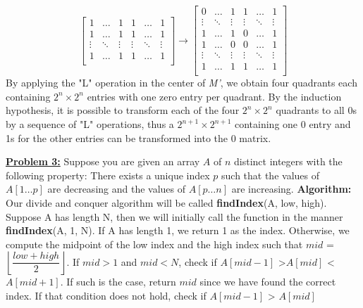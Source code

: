 \documentclass[11pt]{article}
\begin{document}
\begin{flushleft}
\[\begin{bmatrix}
			1      & \dots  & 1      & 1	  & \dots  & 1      \\     
			1      & \dots  & 1      & 1      & \dots  & 1      \\
			\vdots & \ddots & \vdots & \vdots & \ddots & \vdots \\
			1      & \dots  & 1      & 1      & \dots  & 1      \\   
		\end{bmatrix}
		\rightarrow
		\begin{bmatrix}
			0      & \dots  & 1      & 1      & \dots  & 1      \\
			\vdots & \ddots & \vdots & \vdots & \ddots & \vdots \\
			1      & \dots  & 1      & 0 	  & \dots  & 1      \\     
			1      & \dots  & 0      & 0      & \dots  & 1      \\
			\vdots & \ddots & \vdots & \vdots & \ddots & \vdots \\
			1      & \dots  & 1      & 1      & \dots  & 1      \\   
		\end{bmatrix}
		\]
		By applying the "L" operation in the center of \emph{M'}, we obtain four quadrants each containing $2^n \times 2^n$ entries with one zero entry per quadrant. By the induction hypothesis, it is possible to transform each of the four $2^n \times 2^n$ quadrants to all 0s by a sequence of "L" operations, thus a $2^{n + 1} \times 2^{n + 1}$ containing one 0 entry and 1s for the other entries can be transformed into the 0 matrix. 
		\vspace{0.2cm}
		\item \textbf {\underline{Problem 3:}}  Suppose you are given an array $A$ of $n$ distinct
		integers with the following property:
		There exists a unique index $p$ such that the values of
		$A[1\ldots p]$ are decreasing and the values of $A[p \ldots
		n]$ are increasing.\newline\newline
		\textbf{Algorithm:}
		Our divide and conquer algorithm will be called \textbf{findIndex}(A, low, high). Suppose A has length N, then we will initially call the function in the manner \textbf{findIndex}(A, 1, N). If A has length 1, we return 1 as the index. Otherwise, we compute the midpoint of the low index and the high index such that $mid$ = $\left\lfloor\dfrac{low + high}{2}\right\rfloor$. \newline
		If $mid > 1$ and  $mid < N$, check if $A[mid - 1]$ \textgreater $A[mid]$ \textless $A[mid + 1]$. If such is the case, return $mid$ since we have found the correct index. If that condition does not hold, check if \newline $A[mid - 1]$ \textgreater{ $A[mid]$} 

\end{flushleft}
\end{document}
